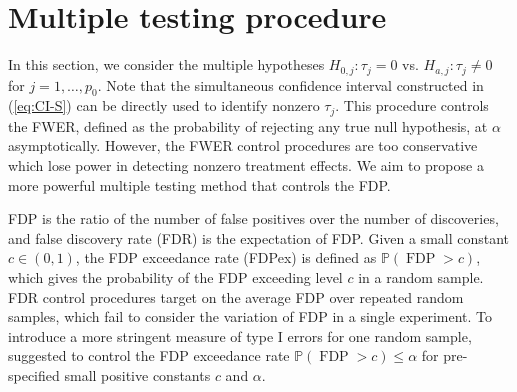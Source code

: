 \documentclass[12pt]{article}
\theoremstyle{definition}
\begin{document}
\setcounter{equation}{0}
\section{Multiple testing procedure}\label{se:multi-test}

In this section, we consider the multiple hypotheses $H_{0, j}: \tau_{j} = 0$ vs. $H_{a, j}: \tau_{j} \neq 0$ for $j = 1, \ldots, p_0$. 
Note that the simultaneous confidence interval constructed in (\ref{eq:CI-S}) can be directly used to identify nonzero $\tau_{j}$. This procedure controls the FWER, defined as the probability of rejecting any true null hypothesis, at $\alpha$ asymptotically. However, the FWER control procedures are too conservative which lose power in detecting nonzero treatment effects. We aim to propose a more powerful multiple testing method that controls the FDP.

FDP is the ratio of the number of false positives over the number of discoveries,
and false discovery rate (FDR) is the expectation of FDP. 
Given a small constant $c \in (0, 1)$, the FDP exceedance rate (FDPex) is defined as $\mathbb{P}(\operatorname{FDP} > c)$, which gives the probability of the FDP exceeding level $c$ in a random sample.
FDR control procedures target on the average FDP over repeated random samples, which fail to consider
the variation of FDP in a single experiment. 
To introduce a more stringent measure of type I errors for one random sample, \cite{GW_2006} suggested to control the FDP exceedance rate 
$\mathbb{P}(\operatorname{FDP} > c) \leq \alpha$ for pre-specified small positive constants $c$ and $\alpha$.
\end{document}
